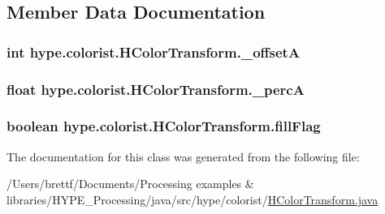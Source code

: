 \subsection{Member Data Documentation}
\hypertarget{classhype_1_1colorist_1_1_h_color_transform_aee4e808255a2c3e3d10980da4c2cc71e}{
\subsubsection[{\-\_\-offset\-A}]{\setlength{\rightskip}{0pt plus 5cm}int hype.\-colorist.\-H\-Color\-Transform.\-\_\-offset\-A}}\label{classhype_1_1colorist_1_1_h_color_transform_aee4e808255a2c3e3d10980da4c2cc71e}
\hypertarget{classhype_1_1colorist_1_1_h_color_transform_aff98c3552490d02a099258f393a99781}{
\subsubsection[{\-\_\-perc\-A}]{\setlength{\rightskip}{0pt plus 5cm}float hype.\-colorist.\-H\-Color\-Transform.\-\_\-perc\-A}}\label{classhype_1_1colorist_1_1_h_color_transform_aff98c3552490d02a099258f393a99781}
\hypertarget{classhype_1_1colorist_1_1_h_color_transform_ae87ee3a68c382df64151c56f8eeca2d4}{
\subsubsection[{fill\-Flag}]{\setlength{\rightskip}{0pt plus 5cm}boolean hype.\-colorist.\-H\-Color\-Transform.\-fill\-Flag\hspace{0.3cm}{\ttfamily [protected]}}}\label{classhype_1_1colorist_1_1_h_color_transform_ae87ee3a68c382df64151c56f8eeca2d4}


The documentation for this class was generated from the following file\-:\begin{DoxyCompactItemize}
\item 
/\-Users/brettf/\-Documents/\-Processing examples \& libraries/\-H\-Y\-P\-E\-\_\-\-Processing/java/src/hype/colorist/\hyperlink{_h_color_transform_8java}{H\-Color\-Transform.\-java}\end{DoxyCompactItemize}
